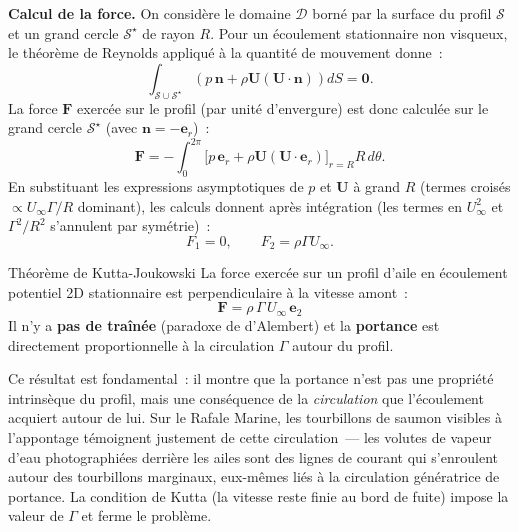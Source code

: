 \documentclass[11pt,a4paper]{report}
\begin{document}
\medskip
\noindent\textbf{Calcul de la force.}
On consid\`ere le domaine $\mathcal{D}$ born\'e par la surface du profil $\mathcal{S}$ et
un grand cercle $\mathcal{S}^\star$ de rayon $R$. Pour un \'ecoulement stationnaire non
visqueux, le th\'eor\`eme de Reynolds appliqu\'e \`a la quantit\'e de mouvement donne~:
\[
  \int_{\mathcal{S}\cup\mathcal{S}^\star}
  \left(p\,\boldsymbol{n} + \rho\boldsymbol{U}(\boldsymbol{U}\cdot\boldsymbol{n})\right)dS
  = \boldsymbol{0}.
\]
La force $\boldsymbol{F}$ exerc\'ee sur le profil (par unit\'e d'envergure) est donc
calcul\'ee sur le grand cercle $\mathcal{S}^\star$ (avec $\boldsymbol{n} = -\boldsymbol{e}_r$)~:
\[
  \boldsymbol{F}
  = -\int_0^{2\pi}\Big[p\,\boldsymbol{e}_r
  + \rho\boldsymbol{U}({\boldsymbol{U}\cdot\boldsymbol{e}_r})\Big]_{r=R} R\,d\theta.
\]
En substituant les expressions asymptotiques de $p$ et $\boldsymbol{U}$ \`a grand $R$
(termes crois\'es $\propto U_\infty\Gamma/R$ dominant), les calculs donnent apr\`es
int\'egration (les termes en $U_\infty^2$ et $\Gamma^2/R^2$ s'annulent par sym\'etrie)~:
\[
  F_1 = 0, \qquad F_2 = \rho\Gamma U_\infty.
\]

\begin{importantbox}{Th\'eor\`eme de Kutta-Joukowski}
La force exerc\'ee sur un profil d'aile en \'ecoulement potentiel 2D stationnaire est
perpendiculaire \`a la vitesse amont~:
\[
  \boldsymbol{F} = \rho\,\Gamma\,U_\infty\,\boldsymbol{e}_2
\]
Il n'y a \textbf{pas de tra\^in\'ee} (paradoxe de d'Alembert) et la \textbf{portance} est
directement proportionnelle \`a la circulation $\Gamma$ autour du profil.
\end{importantbox}

Ce r\'esultat est fondamental~: il montre que la portance n'est pas une propri\'et\'e
intrins\`eque du profil, mais une cons\'equence de la \emph{circulation} que l'\'ecoulement
acquiert autour de lui. Sur le Rafale Marine, les tourbillons de saumon visibles \`a
l'appontage t\'emoignent justement de cette circulation~--- les volutes de vapeur d'eau
photographi\'ees derri\`ere les ailes sont des lignes de courant qui s'enroulent autour des
tourbillons marginaux, eux-m\^emes li\'es \`a la circulation g\'en\'eratrice de portance.
La condition de Kutta (la vitesse reste finie au bord de fuite) impose la valeur de $\Gamma$
et ferme le probl\`eme.
\end{document}
